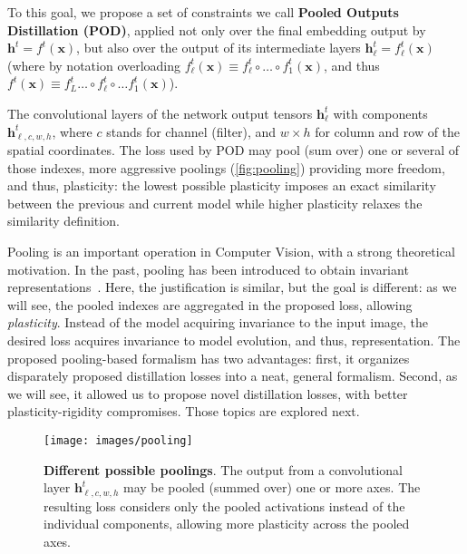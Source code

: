 \documentclass[runningheads]{llncs}
\newcommand{\vx}{\mathbf{x}}
\newcommand{\vh}{\mathbf{h}}
\begin{document}
To this goal, we propose a set of constraints we call \textbf{Pooled Outputs Distillation (POD)}, applied not only over the final embedding output by $\vh^{t}=f^{t}(\vx)$, but also over the output of its intermediate layers $\vh^{t}_\ell=f^{t}_\ell(\vx)$ (where by notation overloading
$f^{t}_\ell(\vx)\equiv f^{t}_\ell\circ\ldots\circ f^{t}_1(\vx)$, and thus
$f^{t}(\vx)\equiv f^{t}_L\ldots\circ f^{t}_\ell\circ\ldots f^{t}_1(\vx)$).

The convolutional layers of the network output tensors $\vh^{t}_{\ell}$ with components $\vh^{t}_{\ell,c,w,h}$, where $c$ stands for channel (filter), and $w\times h$ for column and row of the spatial coordinates. The loss used by POD may pool (sum over) one or several of those indexes, more aggressive poolings (\autoref{fig:pooling}) providing more freedom, and thus, plasticity: the lowest possible plasticity imposes an exact similarity between the previous and current model while higher plasticity relaxes the similarity definition.

Pooling is an important operation in Computer Vision, with a strong theoretical motivation. In the past, pooling has been introduced to obtain invariant representations~\cite{lowe1999sift,lazbnik2006spatial_pyramid_matching}. Here, the justification is similar, but the goal is different: as we will see, the pooled indexes are aggregated in the proposed loss, allowing \textit{plasticity}. Instead of the model acquiring invariance to the input image, the desired loss acquires invariance to model evolution, and thus, representation.
The proposed pooling-based formalism has two advantages: first, it organizes disparately proposed distillation losses into a neat, general formalism. Second, as we will see, it allowed us to propose novel distillation losses, with better plasticity-rigidity compromises. Those topics are explored next.

\begin{figure}[tb]
\begin{center}
    \texttt{[image: images/pooling]}
\end{center}
   \caption{\textbf{Different possible poolings}. The output from a convolutional layer $\vh^{t}_{\ell,c,w,h}$ may be pooled (summed over) one or more axes. The resulting loss considers only the pooled activations instead of the individual components, allowing more plasticity across the pooled axes.}
    \label{fig:pooling}
\end{figure}
\end{document}
